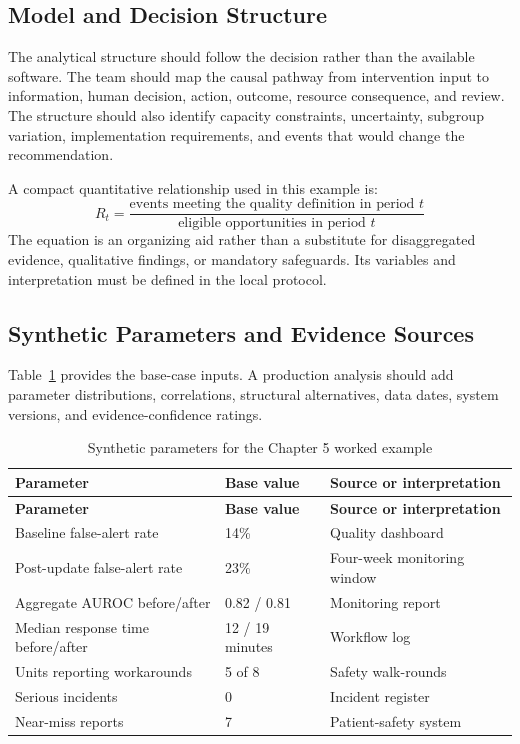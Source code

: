 \subsection{Model and Decision Structure}
The analytical structure should follow the decision rather than the available
software. The team should map the causal pathway from intervention input to
information, human decision, action, outcome, resource consequence, and review.
The structure should also identify capacity constraints, uncertainty, subgroup
variation, implementation requirements, and events that would change the
recommendation.

A compact quantitative relationship used in this example is:
\begin{equation}
R_t=\frac{\text{events meeting the quality definition in period }t}{\text{eligible opportunities in period }t}
\label{eq:comp-ch05-key-relationship}
\end{equation}
The equation is an organizing aid rather than a substitute for disaggregated evidence,
qualitative findings, or mandatory safeguards. Its variables and interpretation must
be defined in the local protocol.

\subsection{Synthetic Parameters and Evidence Sources}
Table~\ref{tab:comp-ch05-parameters} provides the base-case inputs. A
production analysis should add parameter distributions, correlations, structural
alternatives, data dates, system versions, and evidence-confidence ratings.

\begin{longtable}{@{}p{}p{}p{}@{}}
\caption{Synthetic parameters for the Chapter 5 worked example}
\label{tab:comp-ch05-parameters}\\
\toprule
\textbf{Parameter} & \textbf{Base value} & \textbf{Source or interpretation} \\
\midrule
\endfirsthead
\toprule
\textbf{Parameter} & \textbf{Base value} & \textbf{Source or interpretation} \\
\midrule
\endhead
\bottomrule
\endlastfoot
Baseline false-alert rate & 14\% & Quality dashboard \\
Post-update false-alert rate & 23\% & Four-week monitoring window \\
Aggregate AUROC before/after & 0.82 / 0.81 & Monitoring report \\
Median response time before/after & 12 / 19 minutes & Workflow log \\
Units reporting workarounds & 5 of 8 & Safety walk-rounds \\
Serious incidents & 0 & Incident register \\
Near-miss reports & 7 & Patient-safety system \\
\end{longtable}

